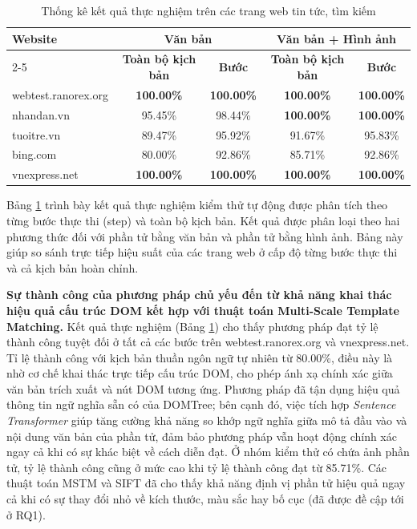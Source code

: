 \documentclass[a4paper, 12pt]{report}
\begin{document}
{\begin{table}[H]
\centering
\caption{Thống kê kết quả thực nghiệm trên các trang web tin tức, tìm kiếm}
\label{tab:thong_ke_1}
\begin{tabular}{|l|c|c|c|c|}
\hline
\multirow{2}{*}{\textbf{Website}} & \multicolumn{2}{c|}{\textbf{Văn bản}} & \multicolumn{2}{c|}{\textbf{Văn bản + Hình ảnh}} \\
\cline{2-5}
 & \textbf{Toàn bộ kịch bản} & \textbf{Bước} & \textbf{Toàn bộ kịch bản} & \textbf{Bước} \\
\hline
webtest.ranorex.org & \textbf{100.00\%} & \textbf{100.00\%} & \textbf{100.00\%} & \textbf{100.00\%} \\
\hline
nhandan.vn & 95.45\% & 98.44\% & \textbf{100.00\%} & \textbf{100.00\%} \\
\hline
tuoitre.vn & 89.47\% & 95.92\% & 91.67\% & 95.83\% \\
\hline
bing.com & 80.00\% & 92.86\% & 85.71\% & 92.86\% \\
\hline
vnexpress.net & \textbf{100.00\%} & \textbf{100.00\%} & \textbf{100.00\%} & \textbf{100.00\%} \\
\hline
\end{tabular}
\end{table}





Bảng \ref{tab:thong_ke_1} trình bày kết quả thực nghiệm kiểm thử tự động được phân tích theo từng bước thực thi (step) và toàn bộ kịch bản. Kết quả được phân loại theo hai phương thức đối với phần tử bằng văn bản và phần tử bằng hình ảnh. Bảng này giúp so sánh trực tiếp hiệu suất của các trang web ở cấp độ từng bước thực thi và cả kịch bản hoàn chỉnh.




\textbf{Sự thành công của phương pháp chủ yếu đến từ khả năng khai thác hiệu quả cấu trúc DOM kết hợp với thuật toán Multi-Scale Template Matching.} Kết quả thực nghiệm (Bảng \ref{tab:thong_ke_1}) cho thấy phương pháp đạt tỷ lệ thành công tuyệt đối ở tất cả các bước trên webtest.ranorex.org và vnexpress.net. Tỉ lệ thành công với kịch bản thuần ngôn ngữ tự nhiên từ 80.00\%, điều này là nhờ cơ chế khai thác trực tiếp cấu trúc DOM, cho phép ánh xạ chính xác giữa văn bản trích xuất và nút DOM tương ứng. Phương pháp đã tận dụng hiệu quả thông tin ngữ nghĩa sẵn có của \gls{DOMTree}; bên cạnh đó, việc tích hợp \textit{Sentence Transformer} giúp tăng cường khả năng so khớp ngữ nghĩa giữa mô tả đầu vào và nội dung văn bản của phần tử, đảm bảo phương pháp vẫn hoạt động chính xác ngay cả khi có sự khác biệt về cách diễn đạt. Ở nhóm kiểm thử có chứa ảnh phần tử, tỷ lệ thành công cũng ở mức cao khi tỷ lệ thành công đạt từ 85.71\%. Các thuật toán MSTM và SIFT đã cho thấy khả năng định vị phần tử hiệu quả ngay cả khi có sự thay đổi nhỏ về kích thước, màu sắc hay bố cục (đã được đề cập tới ở RQ1).







}
\end{document}
